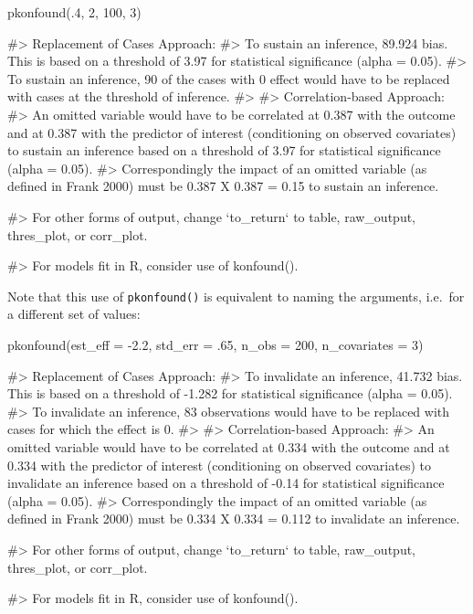 \begin{Schunk}
\begin{Sinput}
pkonfound(.4, 2, 100, 3)
\end{Sinput}
\begin{Soutput}
#> Replacement of Cases Approach:
#> To sustain an inference, 89.924% of the estimate would have to be due to
bias. This is based on a threshold of 3.97 for statistical significance (alpha
= 0.05).
#> To sustain an inference, 90 of the cases with 0 effect would have to be
replaced with cases at the threshold of inference.
#>
#> Correlation-based Approach:
#> An omitted variable would have to be correlated at 0.387 with the outcome
and at 0.387 with the predictor of interest (conditioning on observed
covariates) to sustain an inference based on a threshold of 3.97 for
statistical significance (alpha = 0.05).
#> Correspondingly the impact of an omitted variable (as defined in Frank 2000)
must be 0.387 X 0.387 = 0.15 to sustain an inference.
\end{Soutput}
\begin{Soutput}
#> For other forms of output, change `to_return` to table, raw_output, thres_plot, or corr_plot.
\end{Soutput}
\begin{Soutput}
#> For models fit in R, consider use of konfound().
\end{Soutput}
\end{Schunk}

Note that this use of \texttt{pkonfound()} is equivalent to naming the
arguments, i.e.~for a different set of values:

\begin{Schunk}
\begin{Sinput}
pkonfound(est_eff = -2.2,
          std_err = .65, 
          n_obs = 200,
          n_covariates = 3)
\end{Sinput}
\begin{Soutput}
#> Replacement of Cases Approach:
#> To invalidate an inference, 41.732% of the estimate would have to be due to
bias. This is based on a threshold of -1.282 for statistical significance
(alpha = 0.05).
#> To invalidate an inference, 83 observations would have to be replaced with
cases for which the effect is 0.
#>
#> Correlation-based Approach:
#> An omitted variable would have to be correlated at 0.334 with the outcome
and at 0.334 with the predictor of interest (conditioning on observed
covariates) to invalidate an inference based on a threshold of -0.14 for
statistical significance (alpha = 0.05).
#> Correspondingly the impact of an omitted variable (as defined in Frank 2000)
must be 0.334 X 0.334 = 0.112 to invalidate an inference.
\end{Soutput}
\begin{Soutput}
#> For other forms of output, change `to_return` to table, raw_output, thres_plot, or corr_plot.
\end{Soutput}
\begin{Soutput}
#> For models fit in R, consider use of konfound().
\end{Soutput}
\end{Schunk}

